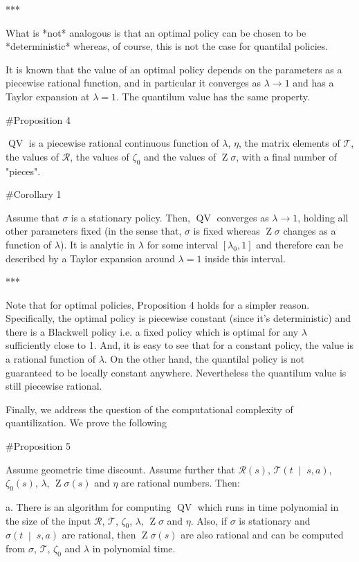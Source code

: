 \documentclass[a4paper]{article}
\newcommand{\AB}[1]{\left[#1\right]}
\newcommand{\APM}[2]{\left(#1\;\middle\vert\;#2\right)}
\newcommand{\T}{\mathcal{T}}
\newcommand{\R}{\mathcal{R}}
\newcommand{\QV}{\operatorname{QV}}
\DeclareMathOperator{\Z}{Z}
\begin{document}
***

What is *not* analogous is that an optimal policy can be chosen to be *deterministic* whereas, of course, this is not the case for quantilal policies.

It is known that the value of an optimal policy depends on the parameters as a piecewise rational function, and in particular it converges as $\lambda \rightarrow 1$ and has a Taylor expansion at $\lambda=1$. The quantilum value has the same property.

\#Proposition 4

$\QV$ is a piecewise rational continuous function of $\lambda$, $\eta$, the matrix elements of $\T$, the values of $\R$, the values of $\zeta_0$ and the values of $\Z\sigma$, with a final number of "pieces".

\#Corollary 1

Assume that $\sigma$ is a stationary policy. Then, $\QV$ converges as $\lambda \rightarrow 1$, holding all other parameters fixed (in the sense that, $\sigma$ is fixed whereas $\Z\sigma$ changes as a function of $\lambda$). It is analytic in $\lambda$ for some interval $\AB{\lambda_0,1}$ and therefore can be described by a Taylor expansion around $\lambda=1$ inside this interval.

***

Note that for optimal policies, Proposition 4 holds for a simpler reason. Specifically, the optimal policy is piecewise constant (since it's deterministic) and there is a Blackwell policy i.e. a fixed policy which is optimal for any $\lambda$ sufficiently close to 1. And, it is easy to see that for a constant policy, the value is a rational function of $\lambda$. On the other hand, the quantilal policy is not guaranteed to be locally constant anywhere. Nevertheless the quantilum value is still piecewise rational.

Finally, we address the question of the computational complexity of quantilization. We prove the following

\#Proposition 5

Assume geometric time discount. Assume further that $\R(s)$, $\T\APM{t}{s,a}$, $\zeta_0(s)$, $\lambda$, $\Z{\sigma}(s)$ and $\eta$ are rational numbers. Then:

a. There is an algorithm for computing $\QV$ which runs in time polynomial in the size of the input $\R$, $\T$, $\zeta_0$, $\lambda$, $\Z\sigma$ and $\eta$. Also, if $\sigma$ is stationary and $\sigma\APM{t}{s,a}$ are rational, then $\Z{\sigma}(s)$ are also rational and can be computed from $\sigma$, $\T$, $\zeta_0$ and $\lambda$ in polynomial time.
\end{document}
